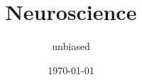 

\title{Neuroscience}
\date{\today}
\author{unbiased}


\maketitle
\begin{inctext}
    \begin{tikzpicture}
        
    \end{tikzpicture}
\end{inctext}
